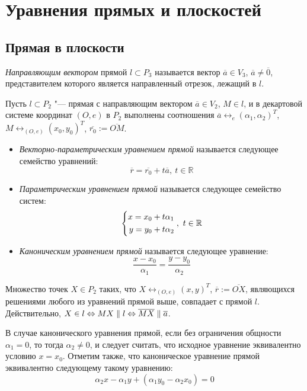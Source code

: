 \section{Уравнения прямых и плоскостей}

\subsection{Прямая в плоскости}

\begin{definition}
	\textit{Направляющим вектором} прямой $l \subset P_3$ называется вектор $\overline{a} \in V_3$, $\overline{a} \ne \overline 0$, представителем которого является направленный отрезок, лежащий в $l$.
\end{definition}

\begin{definition}
	Пусть $l \subset P_2$ "--- прямая с направляющим вектором $\overline{a} \in V_2$, $M \in l$, и в декартовой системе координат $(O, e)$ в $P_2$ выполнены соотношения $\overline{a} \leftrightarrow_{e} (\alpha_1, \alpha_2)^T$, $M \leftrightarrow_{(O, e)} (x_0, y_0)^T$, $\overline{r_0} := \overline{OM}$.
	\begin{itemize}
		\item \textit{Векторно-параметрическим уравнением прямой} называется следующее семейство уравнений:
		\[\overline{r} = \overline{r_0} + t\overline{a},~t \in \mathbb{R}\]
		\item \textit{Параметрическим уравнением прямой} называется следующее семейство систем:
		\[\left\{
		\begin{aligned}
			x = x_0 + t\alpha_1\\
			y = y_0 + t\alpha_2
		\end{aligned}
		\right.,~t \in \mathbb{R}
		\]
		\item \textit{Каноническим уравнением прямой} называется следующее уравнение:
		\[\frac{x - x_0}{\alpha_1} = \frac{y - y_0}{\alpha_2}\]
	\end{itemize}
\end{definition}

\begin{note}
	Множество точек $X \in P_2$ таких, что $X \leftrightarrow_{(O, e)} (x, y)^T$, $\overline{r} := \overline{OX}$, являющихся решениями любого из уравнений прямой выше, совпадает с прямой $l$. Действительно, $X \in l \Leftrightarrow MX \parallel l \Leftrightarrow \overline{MX} \parallel \overline{a}$.
\end{note}

\begin{note}
	В случае канонического уравнения прямой, если без ограничения общности $\alpha_1 = 0$, то тогда $\alpha_2 \ne 0$, и следует считать, что исходное уравнение эквивалентно условию $x = x_0$. Отметим также, что каноническое уравнение прямой эквивалентно следующему такому уравнению:
	\[\alpha_2 x - \alpha_1 y + (\alpha_1 y_0 - \alpha_2 x_0) = 0\]
\end{note}

